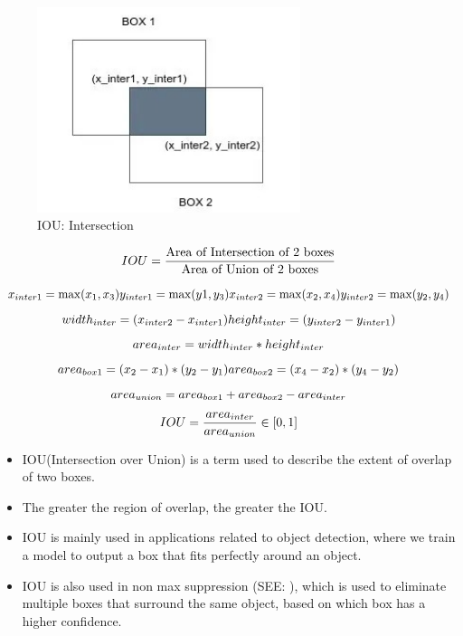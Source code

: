 \begin{table}[H]
\begin{minipage}[b]{0.325\linewidth}
    \end{minipage}
    \hfill
    \begin{minipage}[b]{0.325\linewidth}
        \begin{figure}[H]
            \centering
            \includegraphics[width=\linewidth, height=6cm, keepaspectratio]{Pictures/ds-algo/iou-4.jpg}
            \caption{IOU: Intersection}
        \end{figure}
    \end{minipage}
\end{table}

\[
    \hfill
    \displaystyle IOU = \frac{\text{Area of Intersection of 2 boxes}}{\text{Area of Union of 2 boxes}}
    \hfill
\]

\begin{adjustwidth}{-2cm}{-2cm}

\[
    \hfill
    x_{inter1} = \max(x_1, x_3) 
    \hfill 
    y_{inter1} = \max(y1, y_3)
    \hfill
    x_{inter2} = \max(x_2, x_4) 
    \hfill 
    y_{inter2} = \max(y_2, y_4)
    \hfill
\]
\[
    \hfill
    width_{inter} = (x_{inter2} - x_{inter1})
    \hfill
    height_{inter} = (y_{inter2} - y_{inter1})
    \hfill
\]
\[
    \hfill
    area_{inter} = width_{inter} * height_{inter}
    \hfill
\]
\[
    \hfill
    area_{box1} = (x_2 - x_1) * (y_2 - y_1)
    \hfill
    area_{box2} = (x_4 - x_2) * (y_4 - y_2)
    \hfill
\]
\[
    \hfill
    area_{union} = area_{box1} + area_{box2} - area_{inter}
    \hfill
\]
\[
    \displaystyle
    \hfill
    IOU = \frac{area_{inter}}{area_{union}} \in [0,1]
    \hfill
\]

\end{adjustwidth}

\begin{itemize}
    \item IOU(Intersection over Union) is a term used to describe the extent of overlap of two boxes. 
    
    \item The greater the region of overlap, the greater the IOU.

    \item IOU is mainly used in applications related to object detection, where we train a model to output a box that fits perfectly around an object.

    \item IOU is also used in non max suppression (SEE: ), which is used to eliminate multiple boxes that surround the same object, based on which box has a higher confidence.
\end{itemize}




